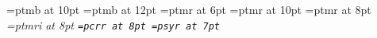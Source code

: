 % 
%
%
\font\bbf=ptmb at 10pt
\font\vbbf=ptmb at 12pt
\font\smrm=ptmr at 6pt
\font\brm=ptmr at 10pt
\font\rm=ptmr at 8pt
\font\it=ptmri at 8pt
\font\tt=pcrr at 8pt
\font\sym=psyr at 7pt
\def\copyright{{\sym\char'323}}
